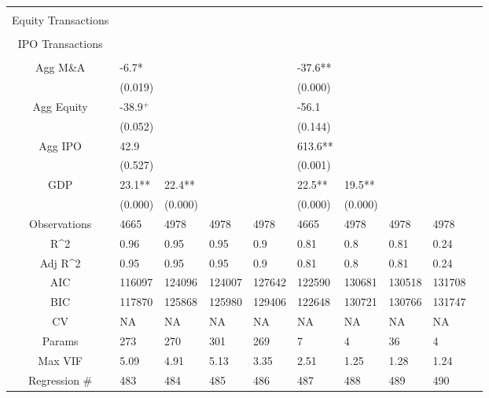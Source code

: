 \documentclass{article}
\begin{document}
\begin{table}[H]
\begin{tabular}{|clllllllll|}
   &  &  &  &  &  &  &  &  & \\ 
  Equity Transactions &  &  &  &  &  &  &  &  & \\ 
   &  &  &  &  &  &  &  &  & \\ 
  IPO Transactions &  &  &  &  &  &  &  &  & \\ 
   &  &  &  &  &  &  &  &  & \\ 
  Agg M\&A & -6.7* &  &  &  & -37.6** &  &  &  & \\ 
   & (0.019) &  &  &  & (0.000) &  &  &  & \\ 
  Agg Equity & -38.9$^{+}$ &  &  &  & -56.1 &  &  &  & \\ 
   & (0.052) &  &  &  & (0.144) &  &  &  & \\ 
  Agg IPO & 42.9 &  &  &  & 613.6** &  &  &  & \\ 
   & (0.527) &  &  &  & (0.001) &  &  &  & \\ 
  GDP & 23.1** & 22.4** &  &  & 22.5** & 19.5** &  &  & \\ 
   & (0.000) & (0.000) &  &  & (0.000) & (0.000) &  &  & \\ 
  \hline 
 Observations & 4665 & 4978 & 4978 & 4978 & 4665 & 4978 & 4978 & 4978 & \\ 
  R^2 & 0.96 & 0.95 & 0.95 & 0.9 & 0.81 & 0.8 & 0.81 & 0.24 & \\ 
  Adj R^2 & 0.95 & 0.95 & 0.95 & 0.9 & 0.81 & 0.8 & 0.81 & 0.24 & \\ 
  AIC & 116097 & 124096 & 124007 & 127642 & 122590 & 130681 & 130518 & 131708 & \\ 
  BIC & 117870 & 125868 & 125980 & 129406 & 122648 & 130721 & 130766 & 131747 & \\ 
  CV & NA & NA & NA & NA & NA & NA & NA & NA & \\ 
  Params & 273 & 270 & 301 & 269 & 7 & 4 & 36 & 4 & \\ 
  Max VIF & 5.09 & 4.91 & 5.13 & 3.35 & 2.51 & 1.25 & 1.28 & 1.24 & \\ 
  Regression \# & 483 & 484 & 485 & 486 & 487 & 488 & 489 & 490 & \\ 
   \hline
\end{tabular}
 
\end{table}
\end{document}
